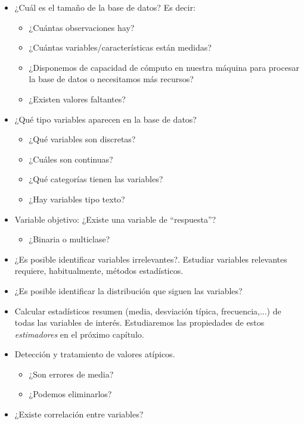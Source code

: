 \documentclass[
  letterpaper,
  DIV=11,
  numbers=noendperiod]{scrreprt}
\providecommand{\tightlist}{%
  \setlength{\itemsep}{0pt}\setlength{\parskip}{0pt}}\usepackage{longtable,booktabs,array}
\begin{document}
\begin{itemize}
\item
  ¿Cuál es el tamaño de la base de datos? Es decir:

  \begin{itemize}
  \item
    ¿Cuántas observaciones hay?
  \item
    ¿Cuántas variables/características están medidas?
  \item
    ¿Disponemos de capacidad de cómputo en nuestra máquina para procesar
    la base de datos o necesitamos más recursos?
  \item
    ¿Existen valores faltantes?
  \end{itemize}
\item
  ¿Qué tipo variables aparecen en la base de datos?

  \begin{itemize}
  \item
    ¿Qué variables son discretas?
  \item
    ¿Cuáles son continuas?
  \item
    ¿Qué categorías tienen las variables?
  \item
    ¿Hay variables tipo texto?
  \end{itemize}
\item
  Variable objetivo: ¿Existe una variable de ``respuesta''?

  \begin{itemize}
  \tightlist
  \item
    ¿Binaria o multiclase?
  \end{itemize}
\item
  ¿Es posible identificar variables irrelevantes?. Estudiar variables
  relevantes requiere, habitualmente, métodos estadísticos.
\item
  ¿Es posible identificar la distribución que siguen las variables?
\item
  Calcular estadísticos resumen (media, desviación típica,
  frecuencia,...) de todas las variables de interés. Estudiaremos las
  propiedades de estos \emph{estimadores} en el próximo capítulo.
\item
  Detección y tratamiento de valores atípicos.

  \begin{itemize}
  \item
    ¿Son errores de media?
  \item
    ¿Podemos eliminarlos?
  \end{itemize}
\item
  ¿Existe correlación entre variables?
\end{itemize}
\end{document}
